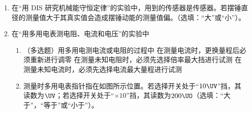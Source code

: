 \documentclass[\gkver]{gaokaozhenti}
\begin{document}
\begin{enumerate}
{由图像可知外力 $F = F_{0} - \frac{F_{0}}{H}x$；在最低点 $F_{0} - mg = ma$，在最高点 $F = F_{0} - \frac{F_{0}}{H}h$，$mg - F = ma$，解方程得 $a = \frac{gh}{2H-h}$。
}

\item
在“用 DIS 研究机械能守恒定律”的实验中，用到的传感器是传感器。若摆锤直径的测量值大于其真实值会造成摆锤动能的测量值偏。（选填：“大”或“小”）。

\item
在“用多用电表测电阻、电流和电压”的实验中
\begin{enumerate}
	\item
	（多选题）用多用电测电流或电阻的过程中
	{在测量电流时，更换量程后必须重新进行调零}
	{在测量未知电阻时，必须先选择倍率最大挡进行试测}
	{在测量未知电流时，必须先选择电流最大量程进行试测}
	\item
	测量时多用电表指针指在如图所示位置。若选择开关处于“$10\UV$”挡，其读数为$\UV$；若选择开关处于“$\times10$”挡，其读数为$200\UO$（选填：“大于”，“等于”或“小于”）。
\end{enumerate}


\end{enumerate}
\end{document}

